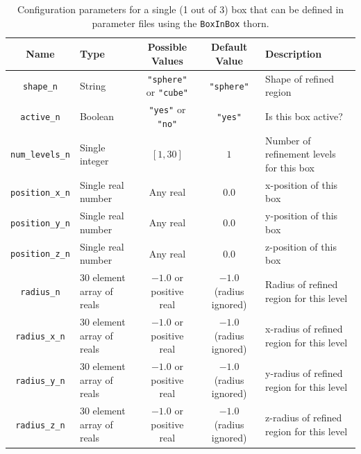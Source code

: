 \begin{table}[ht]
  \begin{tabularx}{\textwidth}{cXccX}
    Name                    & Type                      & Possible Values                                                   & Default Value                   & Description                               \\\hline\hline
    \texttt{shape\_n}       & String                    & \texttt{"sphere"} or \texttt{"cube"}                              & \texttt{"sphere"}               & Shape of refined region                   \\
    \texttt{active\_n}      & Boolean                   & \texttt{"yes"} or \texttt{"no"}                                   &  \texttt{"yes"}                 & Is this box active?                       \\
    \texttt{num\_levels\_n} & Single integer            & $[1,30]$                                                          & $1$                             & Number of refinement levels for this box  \\
    \texttt{position\_x\_n} & Single real number        & Any real                                                          & $0.0$                           & x-position of this box                    \\
    \texttt{position\_y\_n} & Single real number        & Any real                                                          & $0.0$                           & y-position of this box                    \\
    \texttt{position\_z\_n} & Single real number        & Any real                                                          & $0.0$                           & z-position of this box                    \\
    \texttt{radius\_n}      & 30 element array of reals & $-1.0$ or positive real                                           & $-1.0$ (radius ignored)         & Radius of refined region for this level   \\
    \texttt{radius\_x\_n}   & 30 element array of reals & $-1.0$ or positive real                                           & $-1.0$ (radius ignored)         & x-radius of refined region for this level \\
    \texttt{radius\_y\_n}   & 30 element array of reals & $-1.0$ or positive real                                           & $-1.0$ (radius ignored)         & y-radius of refined region for this level \\
    \texttt{radius\_z\_n}   & 30 element array of reals & $-1.0$ or positive real                                           & $-1.0$ (radius ignored)         & z-radius of refined region for this level \\\hline\hline
  \end{tabularx}
  \caption{Configuration parameters for a single (1 out of 3) box that can be defined in parameter files using the \texttt{BoxInBox} thorn.}
  \label{tab:box_config}
\end{table}

